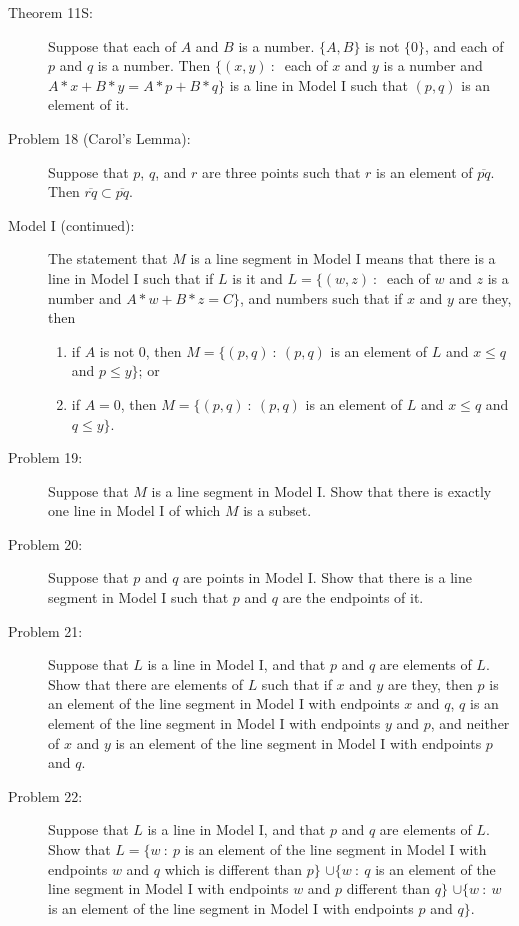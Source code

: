 \documentclass{article}
\begin{document}
\begin{description}
  \item[Theorem 11S:] Suppose that each of $A$ and $B$ is a number. $\{ A,B \}$ is not $\{ 0 \}$, and each of $p$ and $q$ is a number. Then $\{ (x,y)\ :\ $ each of $x$ and $y$ is a number and $A*x + B*y = A*p + B*q \}$ is a line in Model I such that $(p,q)$ is an element of it.

  \item[Problem 18 (Carol's Lemma):] Suppose that $p$, $q$, and $r$ are three points such that $r$ is an element of $\overline{pq}$. Then $\overline{rq} \subset \overline{pq}$.

  \item[Model I (continued):] The statement that $M$ is a line segment in Model I means that there is a line in Model I such that if $L$ is it and $L = \{ (w,z)\ :\ $ each of $w$ and $z$ is a number and $A*w + B*z = C \}$, and numbers such that if $x$ and $y$ are they, then
    \begin{enumerate}[\hspace{1cm}(i.)]
      \item if $A$ is not $0$, then $M = \{ (p,q)\ :\ (p,q)$ is an element of $L$ and $x \leq q$ and $p \leq y \}$; or
      \item if $A = 0$, then $M = \{ (p,q)\ :\ (p,q)$ is an element of $L$ and $x \leq q$ and $q \leq y \}$.
    \end{enumerate}

  \item[Problem 19:] Suppose that $M$ is a line segment in Model I. Show that there is exactly one line in Model I of which $M$ is a subset.

  \item[Problem 20:] Suppose that $p$ and $q$ are points in Model I. Show that there is a line segment in Model I such that $p$ and $q$ are the endpoints of it.

  \item[Problem 21:] Suppose that $L$ is a line in Model I, and that $p$ and $q$ are elements of $L$. Show that there are elements of $L$ such that if $x$ and $y$ are they, then $p$ is an element of the line segment in Model I with endpoints $x$ and $q$, $q$ is an element of the line segment in Model I with endpoints $y$ and $p$, and neither of $x$ and $y$ is an element of the line segment in Model I with endpoints $p$ and $q$. 

  \item[Problem 22:] Suppose that $L$ is a line in Model I, and that $p$ and $q$ are elements of $L$. Show that $L = \{ w\ :\ p$ is an element of the line segment in Model I with endpoints $w$ and $q$ which is different than $p \}$ $\cup \{ w\ :\ q$ is an element of the line segment in Model I with endpoints $w$ and $p$ different than $q \}$ $\cup \{ w\ :\ w$ is an element of the line segment in Model I with endpoints $p$ and $q \}$.


\end{description}
\end{document}
